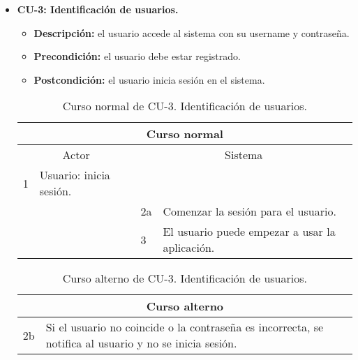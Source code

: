 \begin{itemize}
	\item \textbf{CU-3: Identificación de usuarios.}
	\begin{itemize}
		\item \textbf{Descripción:} el usuario accede al sistema con su username y contraseña.
		\item \textbf{Precondición:} el usuario debe estar registrado.
		\item \textbf{Postcondición:} el usuario inicia sesión en el sistema.
	\end{itemize}
	\begin{table}[H]
		\centering
		\begin{tabular}{|p{0.3cm}|p{5cm}|p{0.3cm}|p{5cm}|}
			\hline
			\multicolumn{4}{|c|}{Curso normal} \\ \hline
			\multicolumn{2}{|c|}{Actor} & \multicolumn{2}{|c|}{Sistema} \\ \hline
			1 & Usuario: inicia sesión. &  &  \\ \hline
			&  & 2a & Comenzar la sesión para el usuario. \\ \hline
			&  & 3 & El usuario puede empezar a usar la aplicación. \\ \hline
		\end{tabular}
		\caption{Curso normal de CU-3. Identificación de usuarios.}
		\label{tabla:cu3-normal}
	\end{table}
	
	\begin{table}[H]
		\centering
		\begin{tabular}{|p{0.3cm}|p{10cm}|}
			\hline
			\multicolumn{2}{|c|}{Curso alterno} \\ \hline
			2b & Si el usuario no coincide o la contraseña es incorrecta, se notifica al usuario y no se inicia sesión. \\ \hline
		\end{tabular}
		\caption{Curso alterno de CU-3. Identificación de usuarios.}
		\label{tabla:cu3-alterno}
	\end{table}
\end{itemize}

